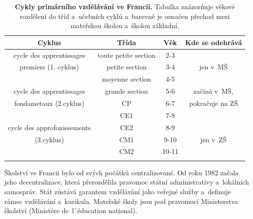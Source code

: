 \begin{spacing}{1.0}
\begin{table}[h]
	\center
	\small
	\begin{center}
	\begin{tabular}{|c|ccc|}
		\hline
		\rowcolor{grey}
		\textbf{Cyklus}				& \textbf{Třída}		& \textbf{Věk}	& \textbf{Kde se odehrává}	\\
		\hline
		\hline
		\rowcolor{grey!10}
	\cellcolor{white} cycle des apprentissages	& toute petite section 	& 2-3 		&				\\ \rowcolor{grey!20}
	\cellcolor{white} premiers (1. cyklus)		& petite section 		& 3-4 		& jen v~MŠ 		\\ \rowcolor{grey!20}
	\cellcolor{white}							& moyenne section 		& 4-5 		& 				\\ \rowcolor{grey!20}
		\hline
	\cellcolor{white} cycle des apprentissages 	& grande section 		& 5-6 		& začíná v~MŠ, 		\\ \rowcolor{grey!50}
	\cellcolor{white} fondametaux (2.cyklus) 		& CP 					& 6-7 		& pokračuje na ZŠ 	\\ \rowcolor{grey!50}
	\cellcolor{white}								& CE1 					& 7-8 		& 					\\ \rowcolor{grey!50}
		\hline
	\cellcolor{white} cycle des approfonissements & CE2 					& 8-9 		&					\\ \rowcolor{grey!50}
	\cellcolor{white} (3.cyklus)					& CM1 					& 9-10 		& jen v~ZŠ 			\\ \rowcolor{grey!50}
	\cellcolor{white}								& CM2 					& 10-11 	& 					\\ \rowcolor{grey!50}
		\hline
	\end{tabular}
	\end{center}
	\caption{ \textbf{Cykly primárního vzdělávání ve Francii.} Tabulka znázorňuje věkové rozdělení do tříd a~učebních cyklů a~barevně je označen přechod mezi mateřskou školou a~školou základní. 
	}
	\label{tab:rozdeleniTridFR}
\end{table}
\end{spacing}
		Školství ve Francii bylo od svých počátků centralizované. Od roku 1982 začala jeho decentralizace, která přerozdělila pravomoc státní administrativy a~lokálních samospráv. Stát zůstává garantem vzdělávání jako veřejné služby a~definuje rámec vzdělávání a kurikula. Mateřské školy jsou pod pravomocí Ministerstva školství (Ministère de l´éducation national).


